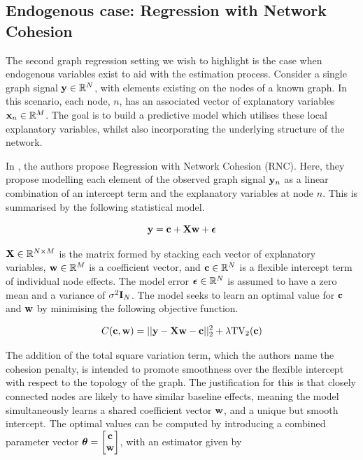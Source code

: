 \subsection{Endogenous case: Regression with Network Cohesion}

The second graph regression setting we wish to highlight is the case when endogenous variables exist to aid with the estimation process. Consider a single graph signal $\mathbf{y} \in \mathbb{R}^N$, with elements existing on the nodes of a known graph. In this scenario, each node, $n$, has an associated vector of explanatory variables $\mathbf{x}_n \in \mathbb{R}^M$. The goal is to build a predictive model which utilises these local explanatory variables, whilst also incorporating the underlying structure of the network. 

In \cite{Li2019}, the authors propose Regression with Network Cohesion (RNC). Here, they propose modelling each element of the observed graph signal $\mathbf{y}_n$ as a linear combination of an intercept term and the explanatory variables at node $n$. This is summarised by the following statistical model. 

\begin{equation}
    \mathbf{y} = \mathbf{c} + \mathbf{X} \mathbf{w} + \boldsymbol{\epsilon}
\end{equation}

$\mathbf{X} \in \mathbb{R}^{N \times M}$ is the matrix formed by stacking each vector of explanatory variables, $\mathbf{w} \in \mathbb{R}^M$ is a coefficient vector, and $\mathbf{c} \in \mathbb{R}^N$ is a flexible intercept term of individual node effects. The model error $\boldsymbol{\epsilon} \in \mathbb{R}^N$ is assumed to have a zero mean and a variance of $\sigma^2 \mathbf{I}_N$. The model seeks to learn an optimal value for $\mathbf{c}$ and $\mathbf{w}$ by minimising the following objective function. 

\begin{equation}
    \label{eq:RNC_objective}
    C(\mathbf{c}, \mathbf{w}) = ||\mathbf{y} - \mathbf{X} \mathbf{w} - \mathbf{c} ||^2_2 + \lambda \text{TV}_2(\mathbf{c})
\end{equation}

The addition of the total square variation term, which the authors name the cohesion penalty, is intended to promote smoothness over the flexible intercept with respect to the topology of the graph. The justification for this is that closely connected nodes are likely to have similar baseline effects, meaning the model simultaneously learns a shared coefficient vector $\mathbf{w}$, and a unique but smooth intercept. The optimal values can be computed by introducing a combined parameter vector $\boldsymbol{\theta} = \begin{bmatrix} \mathbf{c} \\ \mathbf{w}  \end{bmatrix}$, with an estimator given by 


